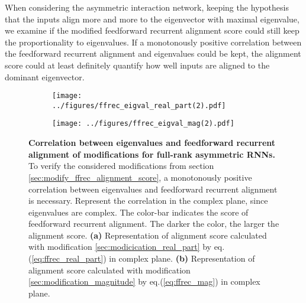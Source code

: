 \documentclass[11pt]{article}
\begin{document}
	When considering the asymmetric interaction network, keeping the hypothesis that the inputs align more and more to the eigenvector with maximal eigenvalue, we examine if the modified feedforward recurrent alignment score could still keep the proportionality to eigenvalues. 
	If a monotonously positive correlation between the feedforward recurrent alignment and eigenvalues could be kept, the alignment score could at least definitely quantify how well inputs are aligned to the dominant eigenvector. 
	
		\begin{figure}[H]
			\centering
			\begin{subfigure}[b]{0.425\textwidth}
				\texttt{[image: ../figures/ffrec\_eigval\_real\_part(2).pdf]}
				\caption{}
				\label{fig:ffrec_real_part}
			\end{subfigure}
			\hfill
			\begin{subfigure}[b]{0.425\textwidth}
				\texttt{[image: ../figures/ffrec\_eigval\_mag(2).pdf]}
				\caption{}
				\label{fig:ffrec_mag}
			\end{subfigure}
			\caption[Correlation between eigenvalues and feedforward recurrent alignment of modifications for full-rank asymmetric RNNs]{\textbf{Correlation between eigenvalues and feedforward recurrent alignment of modifications for full-rank asymmetric RNNs.} To verify the considered modifications from section \ref{sec:modify_ffrec_alignment_score}, a monotonously positive correlation between eigenvalues and feedforward recurrent alignment is necessary. Represent the correlation in the complex plane, since eigenvalues are complex. The color-bar indicates the score of feedforward recurrent alignment. The darker the color, the larger the alignment score.  \textbf{(a)} Representation of alignment score calculated with modification \ref{sec:modicication_real_part} by eq.(\ref{eq:ffrec_real_part}) in complex plane. \textbf{(b)} Representation of alignment score calculated with modification \ref{sec:modification_magnitude} by eq.(\ref{eq:ffrec_mag}) in complex plane.}
		\end{figure}
	
\end{document}
